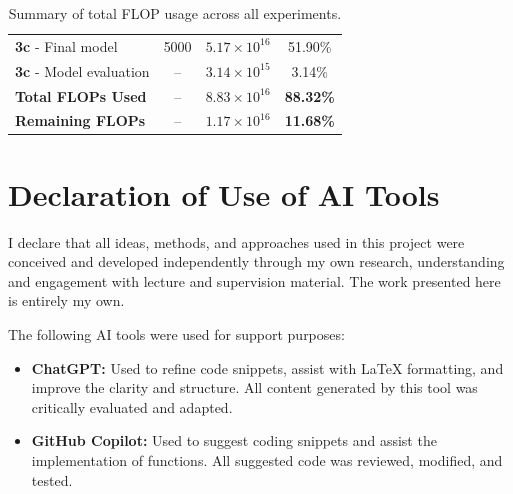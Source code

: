 \documentclass[a4paper,12pt]{article}
\begin{document}
\begin{table}[H]
{\begin{tabular}{|l|c|c|c|}
  \hline
  \textbf{3c} - Final model & 5000 & $5.17 \times 10^{16}$ & 51.90\% \\
  \textbf{3c} - Model evaluation & -- & $3.14 \times 10^{15}$ & 3.14\% \\
  \hline
  \textbf{Total FLOPs Used} & -- & $8.83 \times 10^{16}$ & \textbf{88.32\%} \\
  \hline
  \textbf{Remaining FLOPs} & -- & $1.17 \times 10^{16}$ & \textbf{11.68\%} \\
  \hline
  \end{tabular}%
  }
  \vspace{0.2cm}
  \caption{Summary of total FLOP usage across all experiments.}
  \label{tab:flop-total}
  \end{table}
  




\section*{Declaration of Use of AI Tools}

I declare that all ideas, methods, and approaches used in this project were conceived and developed independently through my own research, understanding and engagement with lecture and supervision material. The work presented here is entirely my own.

The following AI tools were used for support purposes:
\begin{itemize}
    \item \textbf{ChatGPT:} Used to refine code snippets, assist with LaTeX formatting, and improve the clarity and structure. All content generated by this tool was critically evaluated and adapted.
    \item \textbf{GitHub Copilot:} Used to suggest coding snippets and assist the implementation of functions. All suggested code was reviewed, modified, and tested.
\end{itemize}
\end{document}
